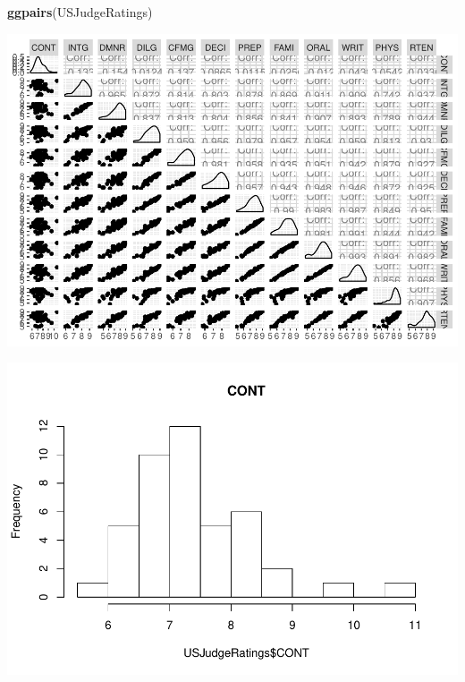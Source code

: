 \documentclass[]{article}
\newenvironment{Shaded}{\begin{snugshade}}{\end{snugshade}}
\newcommand{\DataTypeTok}[1]{\textcolor[rgb]{0.13,0.29,0.53}{#1}}
\newcommand{\KeywordTok}[1]{\textcolor[rgb]{0.13,0.29,0.53}{\textbf{#1}}}
\newcommand{\NormalTok}[1]{#1}
\newcommand{\OperatorTok}[1]{\textcolor[rgb]{0.81,0.36,0.00}{\textbf{#1}}}
\newcommand{\StringTok}[1]{\textcolor[rgb]{0.31,0.60,0.02}{#1}}
\begin{document}
\begin{Shaded}
\begin{Highlighting}[]
\KeywordTok{ggpairs}\NormalTok{(USJudgeRatings)}
\end{Highlighting}
\end{Shaded}

\includegraphics{Homework_Adrien_Toulouse_Paul-Antoine_Girard_files/figure-latex/unnamed-chunk-5-1.pdf}

\begin{Shaded}
\end{Shaded}

\includegraphics{Homework_Adrien_Toulouse_Paul-Antoine_Girard_files/figure-latex/histograms-1.pdf}
\end{document}
